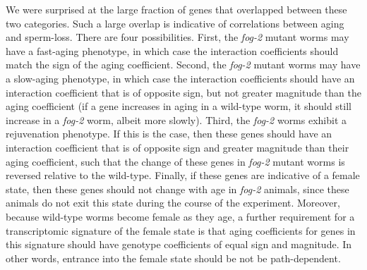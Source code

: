 \documentclass[10pt,letterpaper,twocolumn]{article}
\newcommand{\fog}{\emph{\mbox{fog-2}}}
\begin{document}
We were surprised at the large fraction of genes that overlapped between these
two categories. Such a large overlap is indicative of correlations between aging
and sperm-loss. There are four possibilities. First, the \fog{} mutant worms may
have a fast-aging phenotype, in which case the interaction coefficients should
match the sign of the aging coefficient. Second, the \fog{} mutant worms may
have a slow-aging phenotype, in which case the interaction coefficients should
have an interaction coefficient that is of opposite sign, but not greater
magnitude than the aging coefficient (if a gene increases in aging in a
wild-type worm, it should still increase in a \fog{} worm, albeit more slowly).
Third, the \fog{} worms exhibit a rejuvenation phenotype. If this is the case,
then these genes should have an interaction coefficient that is of opposite sign
and greater magnitude than their aging coefficient, such that the change of
these genes in \fog{} mutant worms is reversed relative to the wild-type.
Finally, if these genes are indicative of a female state, then these genes
should not change with age in \fog{} animals, since these animals do not exit
this state during the course of the experiment. Moreover, because wild-type
worms become female as they age, a further requirement for a transcriptomic
signature of the female state is that aging coefficients for genes in this
signature should have genotype coefficients of equal sign and magnitude. In
other words, entrance into the female state should be not be path-dependent.
\end{document}
